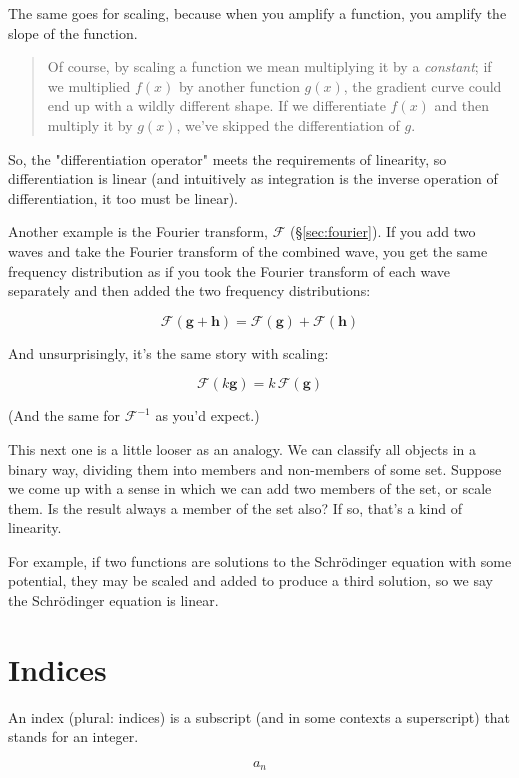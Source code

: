 The same goes for scaling, because when you amplify a function, you amplify the slope of the function.

\begin{quote}
    Of course, by scaling a function we mean multiplying it by a \textit{constant}; if we multiplied $f(x)$ by another function $g(x)$, the gradient curve could end up with a wildly different shape. If we differentiate $f(x)$ and then multiply it by $g(x)$, we've skipped the differentiation of $g$.    
\end{quote}

So, the "differentiation operator" meets the requirements of linearity, so differentiation is linear (and intuitively as integration is the inverse operation of differentiation, it too must be linear).

Another example is the Fourier transform, $\mathcal{F}$ (§\ref{sec:fourier}). If you add two waves and take the Fourier transform of the combined wave, you get the same frequency distribution as if you took the Fourier transform of each wave separately and then added the two frequency distributions:

$$\mathcal{F} (\mathbf{g} + \mathbf{h}) = \mathcal{F} (\mathbf{g}) + \mathcal{F} (\mathbf{h})$$

And unsurprisingly, it's the same story with scaling:

$$\mathcal{F} (k \mathbf{g}) = k \, \mathcal{F} (\mathbf{g})$$

(And the same for $\mathcal{F}^{-1}$ as you'd expect.)

This next one is a little looser as an analogy. We can classify all objects in a binary way, dividing them into members and non-members of some set. Suppose we come up with a sense in which we can add two members of the set, or scale them. Is the result always a member of the set also? If so, that's a kind of linearity.

For example, if two functions are solutions to the Schrödinger equation with some potential, they may be scaled and added to produce a third solution, so we say the Schrödinger equation is linear.

\section{Indices}

An index (plural: indices) is a subscript (and in some contexts a superscript) that stands for an integer.

$$a_n$$

